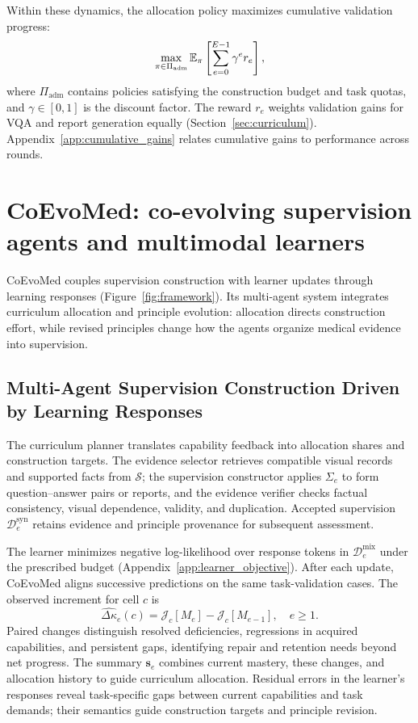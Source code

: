 Within these dynamics, the allocation policy maximizes cumulative validation progress:
\begin{equation}
\max_{\pi\in\Pi_{\mathrm{adm}}}
\mathbb E_{\pi}\left[\sum_{e=0}^{E-1}\gamma^e r_e\right],
\label{eq:objective}
\end{equation}
where $\Pi_{\mathrm{adm}}$ contains policies satisfying the construction budget and task quotas, and $\gamma\in[0,1]$ is the discount factor. The reward $r_e$ weights validation gains for VQA and report generation equally (Section~\ref{sec:curriculum}). Appendix~\ref{app:cumulative_gains} relates cumulative gains to performance across rounds.

\FloatBarrier

\section{CoEvoMed: co-evolving supervision agents and multimodal learners}
\label{sec:method}

CoEvoMed couples supervision construction with learner updates through learning responses (Figure~\ref{fig:framework}). Its multi-agent system integrates curriculum allocation and principle evolution: allocation directs construction effort, while revised principles change how the agents organize medical evidence into supervision.

\subsection{Multi-Agent Supervision Construction Driven by Learning Responses}
\label{sec:multiagent}

The curriculum planner translates capability feedback into allocation shares and construction targets. The evidence selector retrieves compatible visual records and supported facts from $\mathcal S$; the supervision constructor applies $\Sigma_e$ to form question--answer pairs or reports, and the evidence verifier checks factual consistency, visual dependence, validity, and duplication. Accepted supervision $\mathcal D_e^{\mathrm{syn}}$ retains evidence and principle provenance for subsequent assessment.

The learner minimizes negative log-likelihood over response tokens in $\mathcal D_e^{\mathrm{mix}}$ under the prescribed budget (Appendix~\ref{app:learner_objective}). After each update, CoEvoMed aligns successive predictions on the same task-validation cases. The observed increment for cell $c$ is
\begin{equation}
\widehat{\Delta\kappa}_e(c)=\mathcal J_c[M_e]-\mathcal J_c[M_{e-1}],
\quad e\geq1.
\label{eq:capability_change}
\end{equation}
Paired changes distinguish resolved deficiencies, regressions in acquired capabilities, and persistent gaps, identifying repair and retention needs beyond net progress. The summary $\mathbf{s}_e$ combines current mastery, these changes, and allocation history to guide curriculum allocation. Residual errors in the learner's responses reveal task-specific gaps between current capabilities and task demands; their semantics guide construction targets and principle revision.


